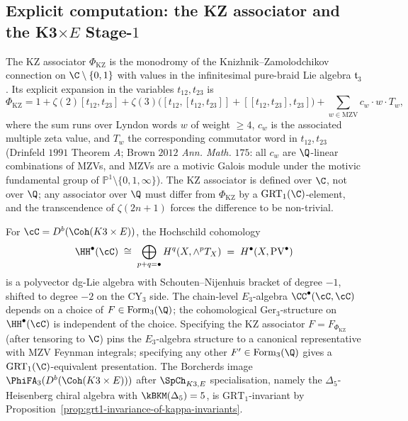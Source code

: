 \subsection*{Explicit computation: the KZ associator and the K3$\times E$ Stage-$1$}

\begin{construction}
\label{constr:kz-associator-explicit}
\ClaimStatusDefinitional
The KZ associator $\Phi_{\mathrm{KZ}}$ is the monodromy of the
Knizhnik--Zamolodchikov connection on $\C \setminus \{0, 1\}$ with
values in the infinitesimal pure-braid Lie algebra $\mathfrak{t}_3$.
Its explicit expansion in the variables $t_{12}, t_{23}$ is
\[
 \Phi_{\mathrm{KZ}} = 1 + \zeta(2) [t_{12}, t_{23}] +
 \zeta(3) \bigl([t_{12}, [t_{12}, t_{23}]] + [[t_{12}, t_{23}], t_{23}]\bigr)
 + \sum_{w \in \mathrm{MZV}} c_w \cdot w \cdot T_w,
\]
where the sum runs over Lyndon words $w$ of weight $\geq 4$, $c_w$ is
the associated multiple zeta value, and $T_w$ the corresponding
commutator word in $t_{12}, t_{23}$ (Drinfeld $1991$ Theorem $A$;
Brown $2012$ \textit{Ann. Math.} $175$: all $c_w$ are
$\Q$-linear combinations of MZVs, and MZVs are a motivic Galois module
under the motivic fundamental group of $\mathbb{P}^1 \setminus
\{0, 1, \infty\}$). The KZ associator is defined over $\C$, not over
$\Q$; any associator over $\Q$ must differ from $\Phi_{\mathrm{KZ}}$ by
a $\mathrm{GRT}_1(\C)$-element, and the transcendence of
$\zeta(2n+1)$ forces the difference to be non-trivial.
\end{construction}

\begin{example}
\label{ex:k3xe-kz-stage-1}
\ClaimStatusConditional
For $\cC = D^b(\Coh(K3 \times E))$, the Hochschild cohomology
\[
 \HH^\bullet(\cC) \;\cong\; \bigoplus_{p+q=\bullet} H^q(X, \wedge^p T_X)
 \;=\; H^\bullet(X, \mathrm{PV}^\bullet)
\]
is a polyvector dg-Lie algebra with Schouten--Nijenhuis bracket of
degree $-1$, shifted to degree $-2$ on the CY$_3$ side. The chain-level
$E_3$-algebra $\CC^\bullet(\cC, \cC)$ depends on a choice of
$F \in \mathrm{Form}_3(\Q)$; the cohomological $\mathrm{Ger}_3$-structure on
$\HH^\bullet(\cC)$ is independent of the choice. Specifying the KZ
associator $F = F_{\Phi_{\mathrm{KZ}}}$ (after tensoring to $\C$) pins
the $E_3$-algebra structure to a canonical representative with MZV
Feynman integrals; specifying any other $F' \in \mathrm{Form}_3(\Q)$
gives a $\mathrm{GRT}_1(\C)$-equivalent presentation. The Borcherds
image $\PhiFA_3(D^b(\Coh(K3 \times E)))$ after $\SpCh_{K3, E}$
specialisation, namely the $\Delta_5$-Heisenberg chiral algebra with
$\kBKM(\Delta_5) = 5$, is $\mathrm{GRT}_1$-invariant by
Proposition~\ref{prop:grt1-invariance-of-kappa-invariants}.
\end{example}

